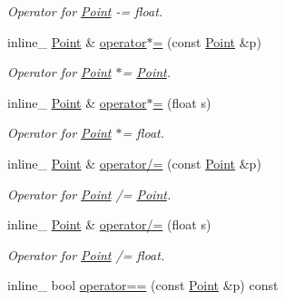 \begin{DoxyCompactItemize}
\begin{DoxyCompactList}\small\item\em Operator for \hyperlink{classPoint}{Point} -\/= float. \end{DoxyCompactList}\item 
inline\+\_\+ \hyperlink{classPoint}{Point} \& \hyperlink{classPoint_ab70d993bc08a203d88dec08d9602fab8}{operator$\ast$=} (const \hyperlink{classPoint}{Point} \&p)\hypertarget{classPoint_ab70d993bc08a203d88dec08d9602fab8}{}\label{classPoint_ab70d993bc08a203d88dec08d9602fab8}

\begin{DoxyCompactList}\small\item\em Operator for \hyperlink{classPoint}{Point} $\ast$= \hyperlink{classPoint}{Point}. \end{DoxyCompactList}\item 
inline\+\_\+ \hyperlink{classPoint}{Point} \& \hyperlink{classPoint_aac93f8dc909f672db678faf4333d325d}{operator$\ast$=} (float s)\hypertarget{classPoint_aac93f8dc909f672db678faf4333d325d}{}\label{classPoint_aac93f8dc909f672db678faf4333d325d}

\begin{DoxyCompactList}\small\item\em Operator for \hyperlink{classPoint}{Point} $\ast$= float. \end{DoxyCompactList}\item 
inline\+\_\+ \hyperlink{classPoint}{Point} \& \hyperlink{classPoint_a998702e4800d00542fcc7fa635aa30b9}{operator/=} (const \hyperlink{classPoint}{Point} \&p)\hypertarget{classPoint_a998702e4800d00542fcc7fa635aa30b9}{}\label{classPoint_a998702e4800d00542fcc7fa635aa30b9}

\begin{DoxyCompactList}\small\item\em Operator for \hyperlink{classPoint}{Point} /= \hyperlink{classPoint}{Point}. \end{DoxyCompactList}\item 
inline\+\_\+ \hyperlink{classPoint}{Point} \& \hyperlink{classPoint_aab3bbb00100c4c2ec9564fc758a74b2a}{operator/=} (float s)\hypertarget{classPoint_aab3bbb00100c4c2ec9564fc758a74b2a}{}\label{classPoint_aab3bbb00100c4c2ec9564fc758a74b2a}

\begin{DoxyCompactList}\small\item\em Operator for \hyperlink{classPoint}{Point} /= float. \end{DoxyCompactList}\item 
inline\+\_\+ bool \hyperlink{classPoint_ad9515b3d10a1030945d7bf810b679acc}{operator==} (const \hyperlink{classPoint}{Point} \&p) const \hypertarget{classPoint_ad9515b3d10a1030945d7bf810b679acc}{}\label{classPoint_ad9515b3d10a1030945d7bf810b679acc}


\end{DoxyCompactItemize}
